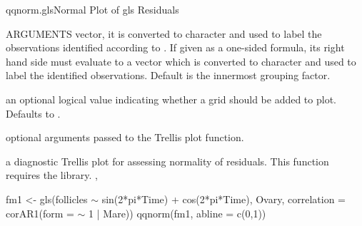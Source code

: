 \documentclass[pdftex]{article} \usepackage{url,graphicx}
\renewcommand{\Twiddle}{\mbox{\(\sim\)}}
\begin{document}
\begin{Helpfile}{qqnorm.gls}{Normal Plot of gls Residuals}
\begin{Argument}{ARGUMENTS}
vector, it is converted to character and used to label the
observations identified according to . If given as a
one-sided formula, its right hand side must evaluate to a vector
which is converted to character and used to label the identified
observations. Default is the innermost grouping factor.
\item[\Co{grid:}]
an optional logical value indicating whether a grid should
be added to plot. Defaults to .
\item[\Co{...:}]
optional arguments passed to the Trellis plot function.
\end{Argument}
a diagnostic Trellis plot for assessing normality of residuals.
 This function requires the  library.
, 
\need 15pt
\vspace{-16pt}
\begin{Example}
fm1 <- gls(follicles {\Twiddle} sin(2*pi*Time) + cos(2*pi*Time), Ovary,
           correlation = corAR1(form = {\Twiddle} 1 | Mare))
qqnorm(fm1, abline = c(0,1))
\end{Example}
\end{Helpfile}
\end{document}
